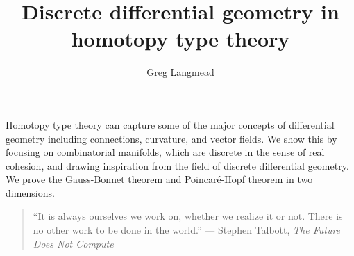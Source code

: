 \documentclass[12pt,fleqn]{article}
\title{Discrete differential geometry in homotopy type theory}
\author{Greg Langmead}
\renewenvironment{abstract}{\section*{\abstractname}}{}
\begin{document}
\maketitle

\begin{abstract}
Homotopy type theory can capture some of the major concepts of differential geometry including connections, curvature, and vector fields. We show this by focusing on combinatorial manifolds, which are discrete in the sense of real cohesion\cite{shulman_cohesion}, and drawing inspiration from the field of discrete differential geometry. We prove the Gauss-Bonnet theorem and Poincaré-Hopf theorem in two dimensions.

\end{abstract}

\begin{quote} 
\centering
``It is always ourselves we work on, whether we realize it or not. There is no other work to be done in the world.'' --- Stephen Talbott, \emph{The Future Does Not Compute}\cite{talbott}
\end{quote}












\end{document}

